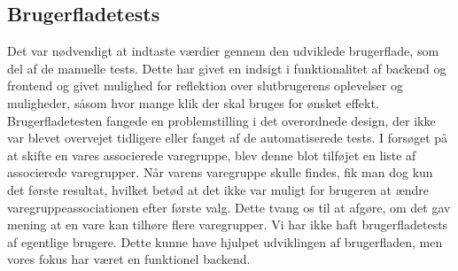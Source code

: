 \documentclass[]{article}
\begin{document}
\subsection{Brugerfladetests} \label{BrugerfladeTests}
Det var nødvendigt at indtaste værdier gennem den udviklede brugerflade, som del af de manuelle tests. Dette har givet en indsigt i funktionalitet af backend og frontend og givet mulighed for reflektion over slutbrugerens oplevelser og muligheder, såsom hvor mange klik der skal bruges for ønsket effekt. \\
Brugerfladetesten fangede en problemstilling i det overordnede design, der ikke var blevet overvejet tidligere eller fanget af de automatiserede tests. I forsøget på at skifte en vares associerede varegruppe, blev denne blot tilføjet en liste af associerede varegrupper. Når varens varegruppe skulle findes, fik man dog kun det første resultat, hvilket betød at det ikke var muligt for brugeren at ændre varegruppeassociationen efter første valg. Dette tvang os til at afgøre, om det gav mening at en vare kan tilhøre flere varegrupper. Vi har ikke haft brugerfladetests af egentlige brugere. Dette kunne have hjulpet udviklingen af brugerfladen, men vores fokus har været en funktionel backend.  
\end{document}
